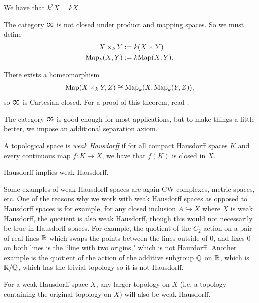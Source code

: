 \documentclass{article}[11pt]
\begin{document}
\begin{note} We have that $k^2 X = kX$.
\end{note}

\begin{note} The category $\texttt{CG}$ is not closed under product and mapping spaces. So we must define
\begin{align*}
	X\times_k Y &:= k(X\times Y) \\
	\textup{Map}_k (X,Y) &:= k\textup{Map}(X,Y).
\end{align*}
\end{note}

\begin{theorem} There exists a homeomorphism
\begin{align*}
	\textup{Map}(X\times_k Y, Z) \cong \textup{Map}_k (X, \textup{Map}_k (Y,Z)),
\end{align*}
so $\texttt{CG}$ is Cartesian closed. For a proof of this theorem, read \cite[Proposition 2.11]{Strickland-cgwh}.
\end{theorem}

The category $\texttt{CG}$ is good enough for most applications, but to make things a little better, we impose an additional separation axiom.

\begin{definition} A topological space is \textit{weak Hausdorff} if for all compact Hausdorff spaces $K$ and every continuous map $f: K \to X$, we have that $f(K)$ is closed in $X$.
\end{definition}

\begin{exercise} Hausdorff implies weak Hausdorff.
\end{exercise}

Some examples of weak Hausdorff spaces are again CW complexes, metric spaces, etc. One of the reasons why we work with weak Hausdorff spaces as opposed to Hausdorff spaces is for example, for any closed inclusion $A\hookrightarrow X$ where $X$ is weak Hausdorff, the quotient is also weak Hausdorff, though this would not necessarily be true in Hausdorff spaces.  For example, the quotient of the $C_2$-action on a pair of real lines $\mathbb{R}$ which swaps the points between the lines outside of 0, and fixes $0$ on both lines is the ``line with two origins," which is not Haurdorff. Another example is the quotient of the action of the additive subgroup $\mathbb{Q}$ on $\mathbb{R}$, which is $\mathbb{R}/\mathbb{Q}$, which has the trivial topology so it is not Hausdorff.

\begin{proposition} For a weak Hausdorff space $X$, any larger topology on $X$ (i.e. a topology containing the original topology on $X$) will also be weak Hausdorff.
\end{proposition}
\end{document}
